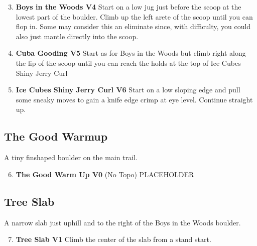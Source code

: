 \begin{multicols*}{2}
				\begin{enumerate}[]
					\setcounter{enumi}{2}
					\item\label{rt:Boys in the Woods} \colorbox{RoyalBlue!20}{\textbf{Boys in the Woods V4 \ding{72}   } }
					\newline Start on a low jug just before the scoop at the lowest part of the boulder. Climb up the left arete of the scoop until you can flop in. Some may consider this an eliminate since, with difficulty, you could also just mantle directly into the scoop.\
					\setcounter{enumi}{3}
					\item\label{rt:Cuba Gooding} \colorbox{RoyalBlue!20}{\textbf{Cuba Gooding V5  } }
					\newline Start as for Boys in the Woods but climb right along the lip of the scoop until you can reach the holds at the top of Ice Cubes Shiny Jerry Curl\
					\setcounter{enumi}{4}
					\item\label{rt:Ice Cubes Shiny Jerry Curl} \colorbox{RoyalBlue!20}{\textbf{Ice Cubes Shiny Jerry Curl V6  } }
					\newline Start on a low sloping edge and pull some sneaky moves to gain a knife edge crimp at eye level. Continue straight up.\
				\end{enumerate}
			\subsection*{The Good Warmup}\label{bf:The Good Warmup}
			A tiny finshaped boulder on the main trail.
			
				\begin{enumerate}[]
					\setcounter{enumi}{5}
					\item\label{rt:The Good Warm Up} \colorbox{green!20}{\textbf{The Good Warm Up V0  } }
						\newline (No Topo) 
					\newline PLACEHOLDER\
				\end{enumerate}
			\subsection*{Tree Slab}\label{bf:Tree Slab}
			A narrow slab just uphill and to the right of the Boys in the Woods boulder.
			
				\begin{enumerate}[]
					\setcounter{enumi}{6}
					\item\label{rt:Tree Slab} \colorbox{green!20}{\textbf{Tree Slab V1  \ding{72}  } }
					\newline Climb the center of the slab from a stand start.\
				\end{enumerate}


\end{multicols*}
